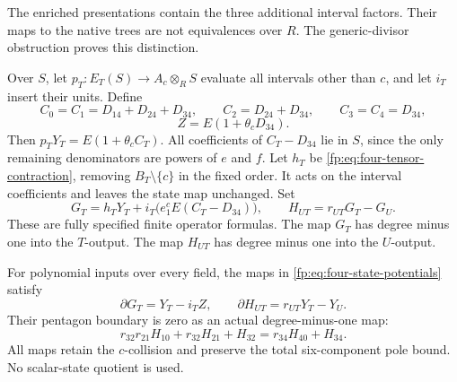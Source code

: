 The enriched presentations contain the three additional interval
factors.  Their maps to the native trees are not equivalences over
\(R\).  The generic-divisor obstruction proves this distinction.

Over \(S\), let \(p_T:E_T(S)\to A_c\otimes_R S\)
evaluate all intervals other than \(c\), and let \(i_T\)
insert their units.  Define
\[
 C_0=C_1=D_{14}+D_{24}+D_{34},\qquad
 C_2=D_{24}+D_{34},\qquad C_3=C_4=D_{34},
\]
\[
 Z=E(1+\theta_cD_{34}).
\]
Then \(p_TY_T=E(1+\theta_cC_T)\).
All coefficients of \(C_T-D_{34}\) lie in \(S\), since
the only remaining denominators are powers of \(e\) and \(f\).
Let \(h_T\) be \eqref{fp:eq:four-tensor-contraction}, removing
\(B_T\setminus\{c\}\) in the fixed order.  It acts on the
interval coefficients and leaves the state map unchanged.
Set
\begin{equation}\label{fp:eq:four-state-potentials}
 G_T=h_TY_T+i_T\bigl(e_1^cE(C_T-D_{34})\bigr),\qquad
 H_{UT}=r_{UT}G_T-G_U.
\end{equation}
These are fully specified finite operator formulas.  The map \(G_T\)
has degree minus one into the \(T\)-output.  The map \(H_{UT}\)
has degree minus one into the \(U\)-output.

\begin{theorem}
\label{fp:thm:four-state-pentagon}
For polynomial inputs over every field, the maps in
\eqref{fp:eq:four-state-potentials} satisfy
\[
 \partial G_T=Y_T-i_TZ,\qquad
 \partial H_{UT}=r_{UT}Y_T-Y_U.
\]
Their pentagon boundary is zero as an actual degree-minus-one map:
\begin{equation}\label{fp:eq:four-state-pentagon}
 r_{32}r_{21}H_{10}+r_{32}H_{21}+H_{32}
       =r_{34}H_{40}+H_{34}.
\end{equation}
All maps retain the \(c\)-collision and preserve the total
six-component pole bound.  No scalar-state quotient is used.
\end{theorem}


